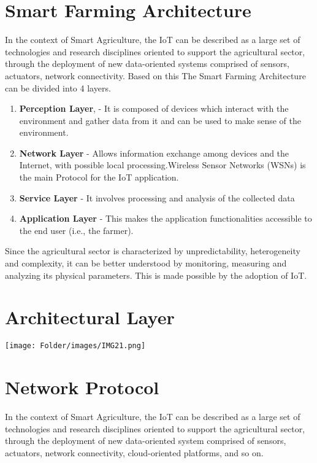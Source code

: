 \documentclass{report}
\begin{document}
\begin{multicols}{1}    
    \section*{Smart Farming Architecture}
    In the context of Smart Agriculture, the IoT can be 
    described as a large set of technologies and research
    disciplines oriented to support the agricultural sector,
    through the deployment of new data-oriented systems
    comprised of sensors, actuators, network connectivity.
    Based on this The Smart Farming Architecture can be divided into 4 layers.
    
    \begin{enumerate}
        \item \textbf{Perception Layer}, - It is composed of devices which interact with the environment and gather data from it and can be used to make sense of the environment. 
        \item \textbf{Network Layer} - Allows information exchange among devices and the Internet, with possible local processing.Wireless Sensor Networks (WSNs) is the main Protocol for the IoT application.
        \item \textbf{Service Layer} - It involves processing and analysis of the collected data 
        \item \textbf{Application Layer} - This makes the application functionalities accessible to the end user (i.e., the farmer).
    \end{enumerate}
        Since the agricultural sector is characterized by unpredictability, heterogeneity and complexity, it can be better understood by monitoring, measuring and analyzing its physical parameters. This is made possible by the adoption of IoT.

    \section*{Architectural Layer}
    \texttt{[image: Folder/images/IMG21.png]}\\
    \section*{Network Protocol}
    In the context of Smart Agriculture, the IoT can be 
    described as a large set of technologies and research disciplines oriented to support the agricultural sector, through the deployment of new data-oriented system comprised of sensors, actuators, network connectivity, cloud-oriented platforms, and so on.\\
    

\end{multicols}
\end{document}
